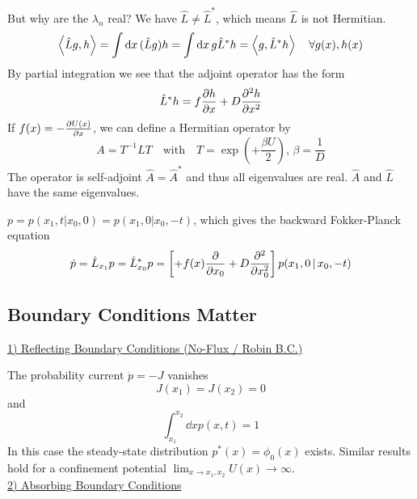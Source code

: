 \documentclass{/home/ben/Templates/notebook}
\begin{document}
	But why are the $\lambda_n$ real? We have $\hat{L} \neq \hat{L}^*$, which means $\hat{L}$ is not Hermitian.
	\begin{equation}
	\expval{\hat{L}g,h}= \int \dd{x} (\hat{L}g)h = \int \dd{x} g \hat{L}^*h = \expval{g,\hat{L}^* h} \quad \forall g(x), h(x)
	\end{equation}
	By partial integration we see that the adjoint operator has the form
	\begin{equation}
	\hat{L}^*h = f \pdv{h}{x} + D \pdv[2]{h}{x}
	\end{equation}
	If $f(x) = - \pdv{U(x)}{x}$, we can define a Hermitian operator by
	\begin{equation}
	A = T^{-1} L T \quad \mathrm{with} \quad T = \exp(+\frac{\beta U}{2}), \, \beta = \frac{1}{D}
	\end{equation}
	The operator is self-adjoint $\hat{A} = \hat{A}^*$ and thus all eigenvalues are real. $\hat{A}$ and $\hat{L}$ have the same eigenvalues. 
	
	\begin{theorem}
		$p = p(x_1,t|x_0,0) = p(x_1,0|x_0,-t)$, which gives the backward Fokker-Planck equation
		\begin{equation}
		\dot{p} = \hat{L}_{x_1} p = \hat{L}^*_{x_0} p = \left[ + f(x) \pdv{x_0} + D \pdv[2]{x_0} \right] p(x_1,0 \, | \, x_0,-t)
		\end{equation}
	\end{theorem}
	
	\subsection*{Boundary Conditions Matter}
	
	\underline{1) Reflecting Boundary Conditions (No-Flux / Robin B.C.)}
	
	The probability current $\dot{p} = -J$ vanishes
	\begin{equation}
	J(x_1) = J(x_2) = 0
	\end{equation}
	and
	\begin{equation}
	\int_{x_1}^{x_2} \dd{x} p(x,t) = 1
	\end{equation}
	In this case the steady-state distribution $p^*(x) = \phi_0(x)$ exists. Similar results hold for a confinement potential $\lim_{x \to x_1, x_2} U(x) \to \infty$. \\
	
	\underline{2) Absorbing Boundary Conditions}
	
\end{document}
